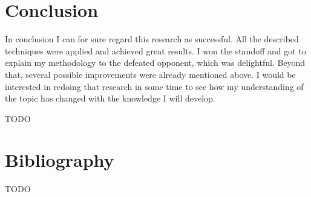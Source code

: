 \documentclass[12pt, titlepage]{article}
\newcommand{\TODO}{\begin{center}\color{red}TODO\end{center}}
\begin{document}
\section{Conclusion}
In conclusion I can for sure regard this research as successful. All the
described techniques were applied and achieved great results. I won the
standoff and got to explain my methodology to the defeated opponent, which
was delightful. Beyond that, several possible improvements were already 
mentioned above. I would be interested in redoing that research in some time
to see how my understanding of the topic has changed with the knowledge I will
develop.
\TODO

\section{Bibliography}
\appendix
\TODO
\end{document}
